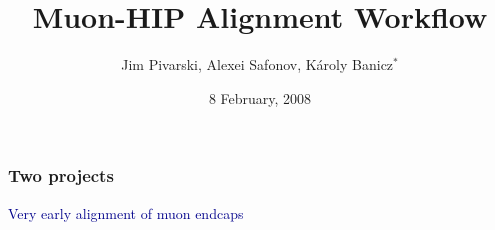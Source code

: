 \documentclass[compress]{beamer}
\title{Muon-HIP Alignment Workflow}
\author{Jim Pivarski, Alexei Safonov, K\'aroly Banicz$^*$}
\institute{Texas A\&M University, $^*$FermiLab}
\date{ 8 February, 2008}
\begin{document}
\frame{\titlepage}


\begin{frame}
\frametitle{Two projects}
\hspace{-0.83 cm} \textcolor{darkblue}{Very early alignment of muon endcaps}


\end{frame}
\end{document}
